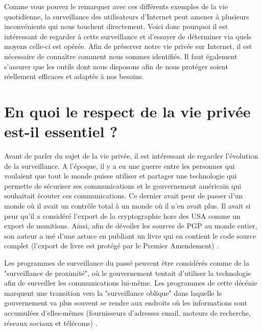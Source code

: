 Comme vous pouvez le remarquer avec ces différents exemples de la vie quotidienne, la surveillance des utilisateurs d'Internet peut amener à plusieurs inconvénients qui nous touchent directement. Voici donc pourquoi il est intéressant de regarder à cette surveillance et d'essayer de déterminer via quels moyens celle-ci est opérée. Afin de préserver notre vie privée sur Internet, il est nécessaire de connaître comment nous sommes identifiés. Il faut également s'assurer que les outils dont nous disposons afin de nous protéger soient réellement efficaces et adaptés à nos besoins.


\section{En quoi le respect de la vie privée est-il essentiel ?}
Avant de parler du sujet de la vie privée, il est intéressant de regarder l'évolution de la surveillance.
A l'époque, il y a eu une guerre entre les personnes qui voulaient que tout le monde puisse utiliser et partager une technologie qui permette de sécuriser ses communications et le gouvernement américain qui souhaitait écouter ces communications. Ce dernier avait peur de passer d'un monde où il avait un contrôle total à un monde où il n'en avait plus. Il avait si peur qu'il a considéré l'export de la cryptographie hors des USA comme un export de munitions. Ainsi, afin de dévoiler les sources de PGP au monde entier, son auteur a usé d'une astuce en publiant un livre qui en contient le code source complet (l'export de livre est protégé par le Premier Amendement) \cite{youtube_moxie_marlinspike}.
\newline

Les programmes de surveillance du passé peuvent être considérés comme de la "surveillance de proximité", où le gouvernement tentait d'utiliser la technologie afin de surveiller les communications lui-même. Les programmes de cette décénie marquent une transition vers la "surveillance oblique" dans laquelle le gouvernement va plus souvent se rendre aux endroits où les informations sont accumulées d'elles-mêmes (fournisseurs d'adresses email, moteurs de recherche, réseaux sociaux et télécoms) \cite{wired_nothing_to_hide}.
\newline

